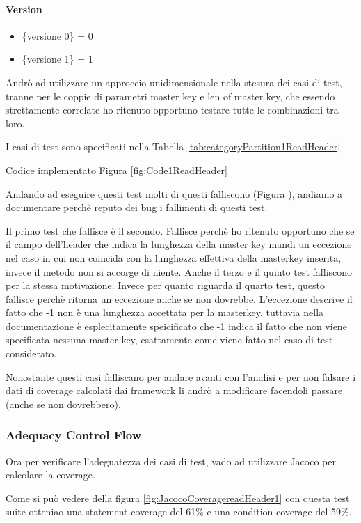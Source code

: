 \documentclass[12pt, a4paper]{article}
\begin{document}
\paragraph{Version}
\begin{itemize}
  \item \{versione 0\} = 0
  \item \{versione 1\} = 1
\end{itemize}

Andrò ad utilizzare un approccio unidimensionale nella stesura dei casi 
di test, tranne per le coppie di parametri master key e len of master key,
che essendo strettamente correlate ho ritenuto opportuno testare tutte le 
combinazioni tra loro.

I casi di test sono specificati nella Tabella \ref{tab:categoryPartition1ReadHeader}

Codice implementato Figura \ref{fig:Code1ReadHeader}


Andando ad eseguire questi test molti di questi falliscono (Figura ), andiamo a documentare perchè reputo 
dei bug i fallimenti di questi test.

Il primo test che fallisce è il secondo. Fallisce perchè ho ritenuto opportuno che se il campo dell'header 
che indica la lunghezza della master key mandi un eccezione nel caso in cui non coincida con la lunghezza effettiva 
della masterkey inserita, invece il metodo non si accorge di niente.
Anche il terzo e il quinto test falliscono per la stessa motivazione. 
Invece per quanto riguarda il quarto test, questo fallisce perchè ritorna un eccezione anche se non dovrebbe. 
L'eccezione descrive il fatto che -1 non è una lunghezza accettata per la masterkey, tuttavia nella documentazione è
esplecitamente speicificato che -1 indica il fatto che non viene specificata nessuna master key, esattamente come viene 
fatto nel caso di test considerato.

Nonostante questi casi falliscano per andare avanti con l'analisi e per non falsare i dati di coverage calcolati
dai framework li andrò a modificare facendoli passare (anche se non dovrebbero).


\subsubsection{Adequacy Control Flow}
Ora per verificare l'adeguatezza dei casi di test, vado ad utilizzare
Jacoco per calcolare la coverage.

Come si può vedere della figura \ref{fig:JacocoCoveragereadHeader1} con questa test suite otteniao
una statement coverage del 61\% e una condition coverage del 59\%.
\end{document}
